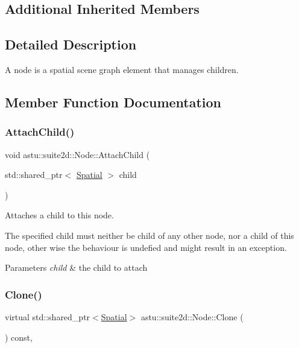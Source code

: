 \subsection*{Additional Inherited Members}


\subsection{Detailed Description}
A node is a spatial scene graph element that manages children. 

\subsection{Member Function Documentation}
\mbox{\label{classastu_1_1suite2d_1_1Node_af777d19c7573db16c4d70c7dcb198292}} 
\subsubsection{\texorpdfstring{Attach\+Child()}{AttachChild()}}
{\footnotesize\ttfamily void astu\+::suite2d\+::\+Node\+::\+Attach\+Child (\begin{DoxyParamCaption}\item[{std\+::shared\+\_\+ptr$<$ \hyperlink{classastu_1_1suite2d_1_1Spatial}{Spatial} $>$}]{child }\end{DoxyParamCaption})}

Attaches a child to this node.

The specified child must neither be child of any other node, nor a child of this node, other wise the behaviour is undefied and might result in an exception.


\begin{DoxyParams}{Parameters}
{\em child} & the child to attach \\
\hline
\end{DoxyParams}
\mbox{\label{classastu_1_1suite2d_1_1Node_a50803fe4a2182ca7320cd2f161873c51}} 
\subsubsection{\texorpdfstring{Clone()}{Clone()}}
{\footnotesize\ttfamily virtual std\+::shared\+\_\+ptr$<$\hyperlink{classastu_1_1suite2d_1_1Spatial}{Spatial}$>$ astu\+::suite2d\+::\+Node\+::\+Clone (\begin{DoxyParamCaption}{ }\end{DoxyParamCaption}) const\hspace{0.3cm}{\ttfamily [override]}, {\ttfamily [virtual]}}

